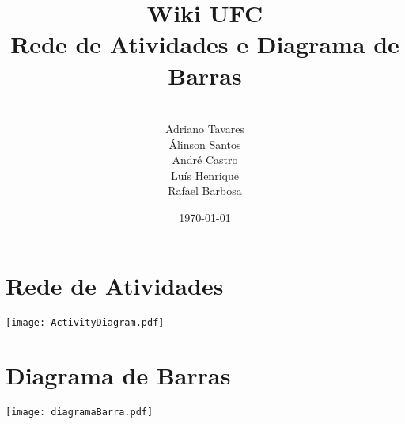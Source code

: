 \documentclass[11pt]{article}
\title{\vspace{8em} \huge{Wiki UFC} \\ \vspace{0.1em} \small{Rede de Atividades e Diagrama de Barras}}
\author{
	\vspace{5em} \\
	\small{Adriano Tavares} \\
	\small{Álinson Santos}  \\
	\small{André Castro}    \\
	\small{Luís Henrique}   \\
	\small{Rafael Barbosa}
}
\date{\today}
\begin{document}
\maketitle
\pagebreak

\tableofcontents
\pagebreak

\section{Rede de Atividades}
\texttt{[image: ActivityDiagram.pdf]}
\pagebreak

\section{Diagrama de Barras}
\texttt{[image: diagramaBarra.pdf]}
\pagebreak
\end{document}
